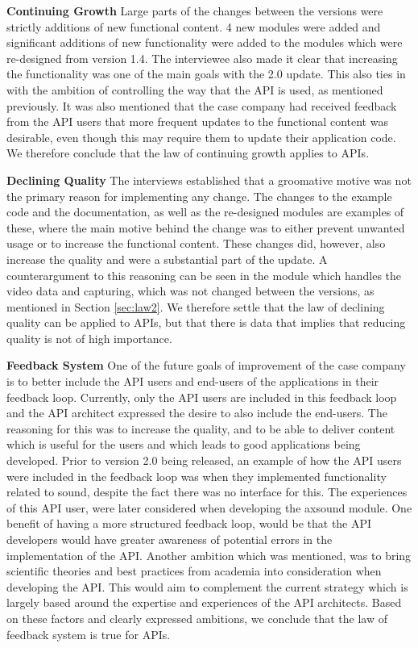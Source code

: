 \documentclass{sig-alternate}
\begin{document}
\smallskip \noindent
\textbf{Continuing Growth} 
Large parts of the changes between the versions were strictly additions of new functional content. 4 new modules were added and significant additions of new functionality were added to the modules which were re-designed from version 1.4. The interviewee also made it clear that increasing the functionality was one of the main goals with the 2.0 update. This also ties in with the ambition of controlling the way that the API is used, as mentioned previously. It was also mentioned that the case company had received feedback from the API users that more frequent updates to the functional content was desirable, even though this may require them to update their application code. We therefore conclude that the law of continuing growth applies to APIs. 

\smallskip \noindent
\textbf{Declining Quality} 
The interviews established that a groomative motive was not the primary reason for implementing any change. The changes to the example code and the documentation, as well as the re-designed modules are examples of these, where the main motive behind the change was to either prevent unwanted usage or to increase the functional content. These changes did, however, also increase the quality and were a substantial part of the update. A counterargument to this reasoning can be seen in the module which handles the video data and capturing, which was not changed between the versions, as mentioned in Section \ref{sec:law2}. We therefore settle that the law of declining quality can be applied to APIs, but that there is data that implies that reducing quality is not of high importance. 

\smallskip \noindent
\textbf{Feedback System} 
One of the future goals of improvement of the case company is to better include the API users and end-users of the applications in their feedback loop. Currently, only the API users are included in this feedback loop and the API architect expressed the desire to also include the end-users. The reasoning for this was to increase the quality, and to be able to deliver content which is useful for the users and which leads to good applications being developed. Prior to version 2.0 being released, an example of how the API users were included in the feedback loop was when they implemented functionality related to sound, despite the fact there was no interface for this.  The experiences of this API user, were later considered when developing the axsound module. One benefit of having a more structured feedback loop, would be that the API developers would have greater awareness of potential errors in the implementation of the API. Another ambition which was mentioned, was to bring scientific theories and best practices from academia into consideration when developing the API. This would aim to complement the current strategy which is largely based around the expertise and experiences of the API architects. Based on these factors and clearly expressed ambitions, we conclude that the law of feedback system is true for APIs. 
\end{document}
